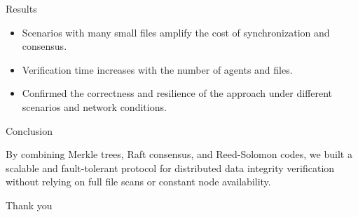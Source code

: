 \begin{frame}{Results}
\begin{itemize}
\item Scenarios with many small files amplify the cost of synchronization and consensus.
\item Verification time increases with the number of agents and files.
\item Confirmed the correctness and resilience of the approach under different scenarios and network conditions.
\end{itemize}
\end{frame}

\begin{frame}{Conclusion}

By combining Merkle trees, Raft consensus, and Reed-Solomon codes, we built a scalable and fault-tolerant protocol for distributed data integrity verification without relying on full file scans or constant node availability.
\end{frame}


\begin{frame}
\centering
    Thank you\par
\end{frame}
